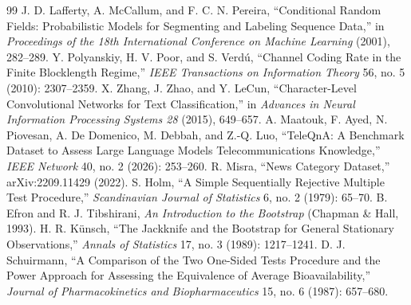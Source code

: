 \begin{thebibliography}{99}
 J. D. Lafferty, A. McCallum, and F. C. N. Pereira, ``Conditional Random Fields: Probabilistic Models for Segmenting and Labeling Sequence Data,'' in \textit{Proceedings of the 18th International Conference on Machine Learning} (2001), 282--289.
 Y. Polyanskiy, H. V. Poor, and S. Verd\'u, ``Channel Coding Rate in the Finite Blocklength Regime,'' \textit{IEEE Transactions on Information Theory} 56, no. 5 (2010): 2307--2359.
 X. Zhang, J. Zhao, and Y. LeCun, ``Character-Level Convolutional Networks for Text Classification,'' in \textit{Advances in Neural Information Processing Systems 28} (2015), 649--657.
 A. Maatouk, F. Ayed, N. Piovesan, A. De Domenico, M. Debbah, and Z.-Q. Luo, ``TeleQnA: A Benchmark Dataset to Assess Large Language Models Telecommunications Knowledge,'' \textit{IEEE Network} 40, no. 2 (2026): 253--260.
 R. Misra, ``News Category Dataset,'' arXiv:2209.11429 (2022).
 S. Holm, ``A Simple Sequentially Rejective Multiple Test Procedure,'' \textit{Scandinavian Journal of Statistics} 6, no. 2 (1979): 65--70.
 B. Efron and R. J. Tibshirani, \textit{An Introduction to the Bootstrap} (Chapman \& Hall, 1993).
 H. R. K\"unsch, ``The Jackknife and the Bootstrap for General Stationary Observations,'' \textit{Annals of Statistics} 17, no. 3 (1989): 1217--1241.
 D. J. Schuirmann, ``A Comparison of the Two One-Sided Tests Procedure and the Power Approach for Assessing the Equivalence of Average Bioavailability,'' \textit{Journal of Pharmacokinetics and Biopharmaceutics} 15, no. 6 (1987): 657--680.
\end{thebibliography}
